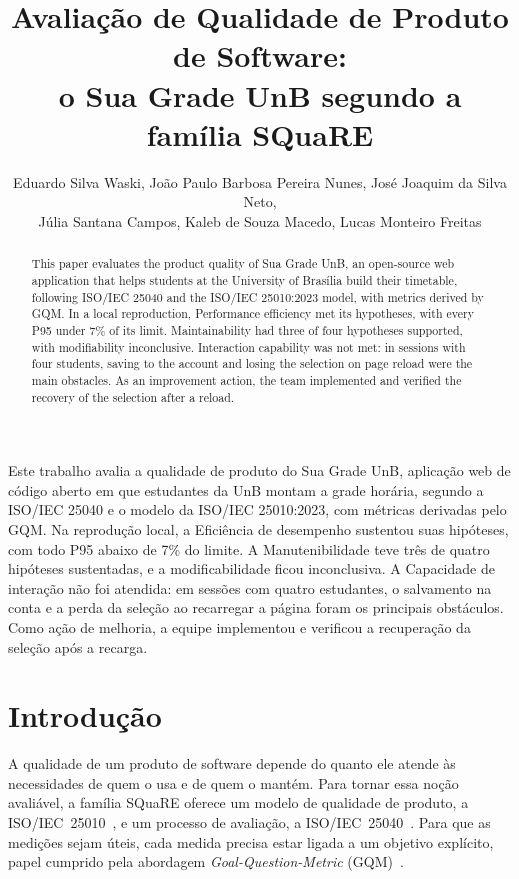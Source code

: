 \documentclass[12pt]{article}
\title{Avaliação de Qualidade de Produto de Software:\\ o Sua Grade UnB segundo a família SQuaRE}
\author{Eduardo Silva Waski\inst{1}, João Paulo Barbosa Pereira Nunes\inst{1},
  José Joaquim da Silva Neto\inst{1},\\ Júlia Santana Campos\inst{1},
  Kaleb de Souza Macedo\inst{1}, Lucas Monteiro Freitas\inst{1}}
\begin{document}
\maketitle

\begin{abstract}
This paper evaluates the product quality of Sua Grade UnB, an open-source web
application that helps students at the University of Brasília build their
timetable, following ISO/IEC 25040 and the ISO/IEC 25010:2023 model, with
metrics derived by GQM. In a local reproduction, Performance efficiency met its
hypotheses, with every P95 under 7\% of its limit. Maintainability had three of
four hypotheses supported, with modifiability inconclusive. Interaction
capability was not met: in sessions with four students, saving to the account
and losing the selection on page reload were the main obstacles. As an
improvement action, the team implemented and verified the recovery of the
selection after a reload.
\end{abstract}

\begin{resumo}
Este trabalho avalia a qualidade de produto do Sua Grade UnB, aplicação web de
código aberto em que estudantes da UnB montam a grade horária, segundo a
ISO/IEC 25040 e o modelo da ISO/IEC 25010:2023, com métricas derivadas pelo GQM.
Na reprodução local, a Eficiência de desempenho sustentou suas hipóteses, com
todo P95 abaixo de 7\% do limite. A Manutenibilidade teve três de quatro
hipóteses sustentadas, e a modificabilidade ficou inconclusiva. A Capacidade de
interação não foi atendida: em sessões com quatro estudantes, o salvamento na
conta e a perda da seleção ao recarregar a página foram os principais
obstáculos. Como ação de melhoria, a equipe implementou e verificou a
recuperação da seleção após a recarga.
\end{resumo}

\section{Introdução}\label{sec:intro}

A qualidade de um produto de software depende do quanto ele atende às
necessidades de quem o usa e de quem o mantém. Para tornar essa noção avaliável,
a família SQuaRE oferece um modelo de qualidade de produto, a
ISO/IEC~25010~\cite{iso25010}, e um processo de avaliação, a
ISO/IEC~25040~\cite{iso25040}. Para que as medições sejam úteis, cada medida
precisa estar ligada a um objetivo explícito, papel cumprido pela abordagem
\textit{Goal-Question-Metric} (GQM)~\cite{basili1994gqm}.
\end{document}
